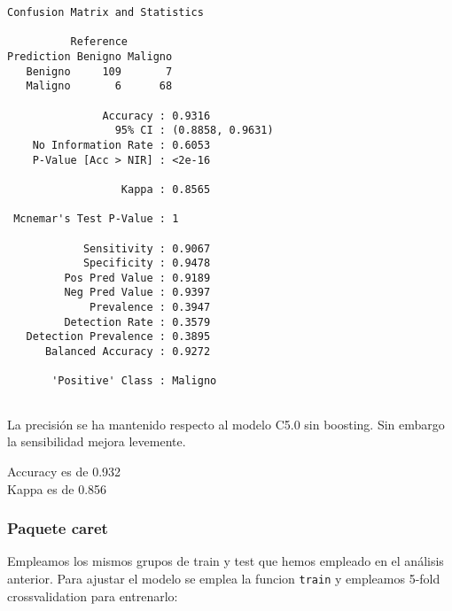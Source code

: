 \documentclass[
]{article}
\begin{document}
\begin{verbatim}
Confusion Matrix and Statistics

          Reference
Prediction Benigno Maligno
   Benigno     109       7
   Maligno       6      68
                                          
               Accuracy : 0.9316          
                 95% CI : (0.8858, 0.9631)
    No Information Rate : 0.6053          
    P-Value [Acc > NIR] : <2e-16          
                                          
                  Kappa : 0.8565          
                                          
 Mcnemar's Test P-Value : 1               
                                          
            Sensitivity : 0.9067          
            Specificity : 0.9478          
         Pos Pred Value : 0.9189          
         Neg Pred Value : 0.9397          
             Prevalence : 0.3947          
         Detection Rate : 0.3579          
   Detection Prevalence : 0.3895          
      Balanced Accuracy : 0.9272          
                                          
       'Positive' Class : Maligno         
                                          
\end{verbatim}

La precisión se ha mantenido respecto al modelo C5.0 sin boosting. Sin
embargo la sensibilidad mejora levemente.

Accuracy es de 0.932\\
Kappa es de 0.856

\hypertarget{paquete-caret-1}{%
\subsubsection{Paquete caret}\label{paquete-caret-1}}

Empleamos los mismos grupos de train y test que hemos empleado en el
análisis anterior. Para ajustar el modelo se emplea la funcion
\texttt{train} y empleamos 5-fold crossvalidation para entrenarlo:
\end{document}
